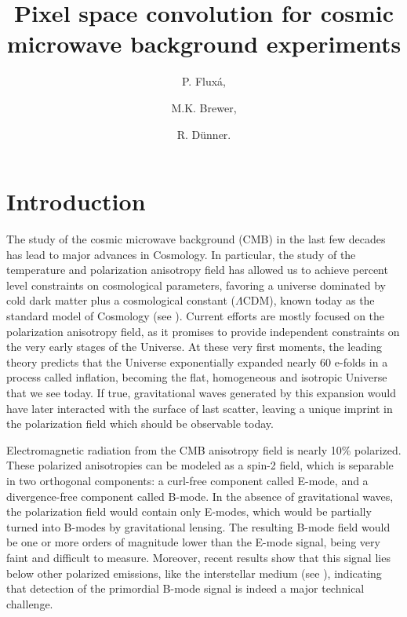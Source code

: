\documentclass[a4paper,11pt]{article}
\title{\boldmath Pixel space convolution for cosmic microwave background experiments}
\author[a]{P. Flux\'a, }
\author[b]{M.K. Brewer, }
\author[a]{R. D\"unner.}
\affiliation[a]{Instituto de Astrof\'isica, Pontificia Universidad Cat\'olica de Chile ,\\Vicu\~na Mackenna 4860, Chile}
\affiliation[b]{Department of Astronomy, Johns Hopkins University,\\Baltimore MD, USA}
\begin{document}
\maketitle
\flushbottom


\section{Introduction}


The study of the cosmic microwave background (CMB) in the last few decades has lead to major advances in Cosmology. In particular, the study of the temperature and polarization anisotropy field has allowed us to achieve percent level constraints on cosmological parameters, favoring a universe dominated by cold dark matter plus a cosmological constant ($\Lambda$CDM), known today as the standard model of Cosmology (see \cite{2016A&A...594A..12P}). Current efforts are mostly focused on the polarization anisotropy field, as it promises to provide independent constraints on the very early stages of the Universe. At these very first moments, the leading theory predicts that the Universe exponentially expanded nearly 60 e-folds in a process called inflation, becoming the flat, homogeneous and isotropic Universe that we see today. If true, gravitational waves generated by this expansion would have later interacted with the surface of last scatter, leaving a unique imprint in the polarization field which should be observable today.

Electromagnetic radiation from the CMB anisotropy field is nearly 10\% polarized. These polarized anisotropies can be modeled as a spin-2 field, which is separable in two orthogonal components: a curl-free component called E-mode, and a divergence-free component called B-mode. In the absence of gravitational waves, the polarization field would contain only E-modes, which would be partially turned into B-modes by gravitational lensing. The resulting B-mode field would be one or more orders of magnitude lower than the E-mode signal, being very faint and difficult to measure. Moreover, recent results show that this signal lies below other polarized emissions, like the interstellar medium (see \cite{2018PhRvL.121v1301B}), indicating that detection of the primordial B-mode signal is indeed a major technical challenge.
\end{document}
